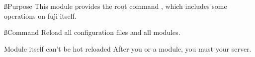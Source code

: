 \ss{Purpose}
This module provides the root command , which includes some operations on fuji itself.

\ss{Command}
Reload all configuration files and all modules.

\begin{note}{Module itself can't be hot reloaded}
    After you  or  a module, you must  your server.
\end{note}


